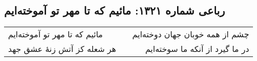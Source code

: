 \begin{center}
\section*{رباعی شماره ۱۳۲۱: مائیم که تا مهر تو آموخته‌ایم}
\label{sec:1321}
\begin{longtable}{l p{0.5cm} r}
مائیم که تا مهر تو آموخته‌ایم
&&
چشم از همه خوبان جهان دوخته‌ایم
\\
هر شعله کز آتش زنهٔ عشق جهد
&&
در ما گیرد از آنکه ما سوخته‌ایم
\\
\end{longtable}
\end{center}
